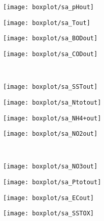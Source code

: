 \begin{figure}[h]
	\begin{subfigure}{0.24\textwidth}
		\texttt{[image: boxplot/sa\_pHout]}	\centering
	\end{subfigure}
	\begin{subfigure}{0.24\textwidth}
		\texttt{[image: boxplot/sa\_Tout]}	\centering
	\end{subfigure}
	\begin{subfigure}{0.24\textwidth}
		\texttt{[image: boxplot/sa\_BODout]}	\centering
	\end{subfigure}
	\begin{subfigure}{0.24\textwidth}
		\texttt{[image: boxplot/sa\_CODout]}	\centering
	\end{subfigure}
	\\[1ex]
	\begin{subfigure}{0.24\textwidth}
		\texttt{[image: boxplot/sa\_SSTout]}	\centering
	\end{subfigure}
	\begin{subfigure}{0.24\textwidth}
		\texttt{[image: boxplot/sa\_Ntotout]}	\centering
	\end{subfigure}
	\begin{subfigure}{0.24\textwidth}
		\texttt{[image: boxplot/sa\_NH4+out]}	\centering
	\end{subfigure}
	\begin{subfigure}{0.24\textwidth}
		\texttt{[image: boxplot/sa\_NO2out]}	\centering
	\end{subfigure}
	\\[1ex]
	\begin{subfigure}{0.24\textwidth}
		\texttt{[image: boxplot/sa\_NO3out]}	\centering
	\end{subfigure}
	\begin{subfigure}{0.24\textwidth}
		\texttt{[image: boxplot/sa\_Ptotout]}	\centering
	\end{subfigure}
	\begin{subfigure}{0.24\textwidth}
		\texttt{[image: boxplot/sa\_ECout]}	\centering
	\end{subfigure}
	\begin{subfigure}{0.24\textwidth}
		\texttt{[image: boxplot/sa\_SSTOX]}	\centering
	\end{subfigure}
	\\[1ex]
	\begin{subfigure}{0.24\textwidth}

\end{subfigure}
\end{figure}
